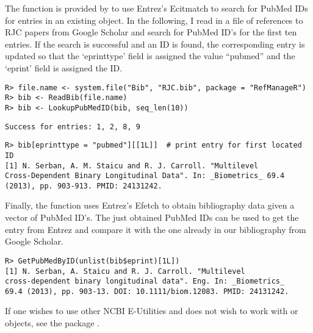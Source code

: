 \documentclass[article]{jss}\usepackage[]{graphicx}\usepackage[]{color}
\makeatletter
\newenvironment{kframe}{%
 \def\at@end@of@kframe{}%
 \ifinner\ifhmode%
  \def\at@end@of@kframe{\end{minipage}}%
  \begin{minipage}{\columnwidth}%
 \fi\fi%
 \def\FrameCommand##1{\hskip\@totalleftmargin \hskip-\fboxsep
 \colorbox{shadecolor}{##1}\hskip-\fboxsep
     \hskip-\linewidth \hskip-\@totalleftmargin \hskip\columnwidth}%
 \MakeFramed {\advance\hsize-\width
   \@totalleftmargin\z@ \linewidth\hsize
   \@setminipage}}%
 {\par\unskip\endMakeFramed%
 \at@end@of@kframe}
\newenvironment{knitrout}{}{} %
\newcommand{\ourpkg}{\pkg{RefManageR}}
\makeatother
\begin{document}
The  function is provided by \ourpkg{} to use Entrez's Ecitmatch to search for PubMed IDs for entries in an existing  object.  In the following, I read in a \Bibtex{} file of references to RJC papers from Google Scholar and search for PubMed ID's for the first ten entries.  If the search is successful and an ID is found, the corresponding entry is updated so that the `eprinttype' field is assigned the value “pubmed” and the `eprint' field is assigned the ID.
\begin{knitrout}
\color{fgcolor}\begin{kframe}
\begin{verbatim}
R> file.name <- system.file("Bib", "RJC.bib", package = "RefManageR")
R> bib <- ReadBib(file.name)
R> bib <- LookupPubMedID(bib, seq_len(10))
\end{verbatim}
\begin{lstlisting}[style=output]
Success for entries: 1, 2, 8, 9
\end{lstlisting}\begin{verbatim}
R> bib[eprinttype = "pubmed"][[1L]]  # print entry for first located ID
[1] N. Serban, A. M. Staicu and R. J. Carroll. "Multilevel
Cross-Dependent Binary Longitudinal Data". In: _Biometrics_ 69.4
(2013), pp. 903-913. PMID: 24131242.
\end{verbatim}
\end{kframe}
\end{knitrout}


Finally, the  function uses Entrez's Efetch to obtain bibliography data given a vector of PubMed ID's.  The just obtained PubMed IDs can be used to get the \Bibtex{} entry from Entrez and compare it with the one already in our bibliography from Google Scholar.
\begin{knitrout}
\color{fgcolor}\begin{kframe}
\begin{verbatim}
R> GetPubMedByID(unlist(bib$eprint)[1L])
[1] N. Serban, A. Staicu and R. J. Carroll. "Multilevel
cross-dependent binary longitudinal data". Eng. In: _Biometrics_
69.4 (2013), pp. 903-13. DOI: 10.1111/biom.12083. PMID: 24131242.
\end{verbatim}
\end{kframe}
\end{knitrout}

If one wishes to use other NCBI E-Utilities and does not wish to work with  or  objects, see the  package \citep{rentrez}.
\end{document}
